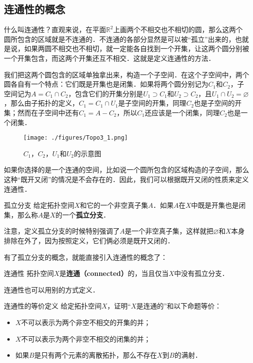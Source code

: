 
\subsection{连通性的概念}
什么叫连通性？直观来说，在平面$\mathbb{R}^2$上画两个不相交也不相切的圆，那么这两个圆所包含的区域就是不连通的．不连通的各部分显然是可以被“孤立”出来的，也就是说，如果两圆不相交也不相切，就一定能各自找到一个开集，让这两个圆分别被一个开集包含，而这两个开集还互不相交．这就是定义连通性的方法．

我们把这两个圆包含的区域单独拿出来，构造一个子空间．在这个子空间中，两个圆各自有一个特点：它们既是开集也是闭集．如果将两个圆分别记为$C_1$和$C_2$，子空间记为$A=C_1\cap C_2$，包含它们的开集分别是$U_1\supset C_1$和$U_2\supset C_2$，且$U_1\cap U_2=\varnothing$，那么由子拓扑的定义，$C_1=C_1\cap U_1$是子空间的开集，同理$C_2$也是子空间的开集；然而在子空间中还有$C_1=A-C_2$，所以$C_1$还应该是一个闭集，同理$C_2$也是一个闭集．

\begin{figure}[ht]
\centering
\texttt{[image: ./figures/Topo3\_1.png]}
\caption{$C_1$，$C_2$，$U_1$和$U_2$的示意图} \label{Topo3_fig1}
\end{figure}

如果你选择的是一个连通的空间，比如说一个圆所包含的区域构造的子空间，那么这种“既开又闭”的情况是不会存在的．因此，我们可以根据既开又闭的性质来定义连通性．

\begin{definition}{孤立分支}
给定拓扑空间$X$和它的一个非空真子集$A$．如果$A$在$X$中既是开集也是闭集，那么称$A$是$X$的一个\textbf{孤立分支}．
\end{definition}

注意，定义孤立分支的时候特别强调了$A$是一个非空真子集，这样就把$\varnothing$和$X$本身排除在外了，因为按照定义，它们俩必须是既开又闭的．

有了孤立分支的概念，就能直接引入连通性的概念了：

\begin{definition}{连通性}
拓扑空间$X$是\textbf{连通（connected）}的，当且仅当$X$中没有孤立分支．
\end{definition}

连通性也可以用别的方式定义．

\begin{exercise}{连通性的等价定义}\label{Topo3_exe1}
给定拓扑空间$X$，证明“$X$是连通的”和以下命题等价：
\begin{itemize}
\item $X$不可以表示为两个非空不相交的开集的并；
\item $X$不可以表示为两个非空不相交的闭集的并；
\item 如果$B$是只有两个元素的离散拓扑，那么不存在$X$到$B$的满射．

\end{itemize}
\end{exercise}

